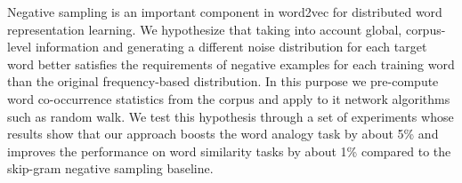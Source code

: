 Negative sampling is an important component in word2vec for distributed word representation learning. We hypothesize that taking into account global, corpus-level information and generating a different noise distribution for each target word better satisfies the requirements of negative examples for each training word than the original frequency-based distribution. In this purpose we pre-compute word co-occurrence statistics from the corpus and apply to it network algorithms such as random walk. We test this hypothesis through a set of experiments whose results show that our approach boosts the word analogy task by about 5\% and improves the performance on word similarity tasks by about 1\% compared to the skip-gram negative sampling baseline.
